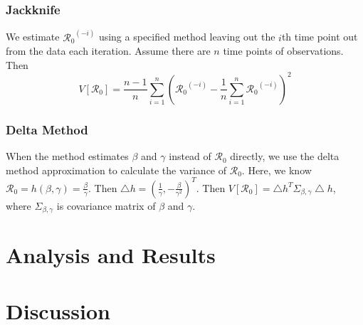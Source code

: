 \documentclass[12pt]{article}
\newcommand{\rr}{\ensuremath{\mathcal{R}_0}}
\begin{document}
\subsubsection{Jackknife}\label{jackknife}

We estimate \(\rr^{(-i)}\) using a specified method leaving out the
\(i\)th time point out from the data each iteration. Assume there are
\(n\) time points of observations. Then
\[V[\rr] = \frac{n-1}{n} \sum_{i=1}^n \left (\rr^{(-i)} - \frac{1}{n} \sum_{i=1}^n\rr^{(-i)} \right)^2\]

\subsubsection{Delta Method}\label{delta-method}

When the method estimates \(\beta\) and \(\gamma\) instead of \(\rr\)
directly, we use the delta method approximation to calculate the
variance of \(\rr\). Here, we know
\(\rr = h(\beta, \gamma) = \frac{\beta}{\gamma}\). Then
\(\bigtriangleup h = (\frac{1}{\gamma}, - \frac{\beta}{\gamma^2})^T\).
Then
\(V[\rr] = \bigtriangleup h^T \Sigma_{\beta, \gamma} \bigtriangleup h\),
where \(\Sigma_{\beta, \gamma}\) is covariance matrix of \(\beta\) and
\(\gamma\).




\section{Analysis and Results}
\label{sec:results}

\section{Discussion}
\label{sec:dis}


\label{sec:details}





\end{document}
